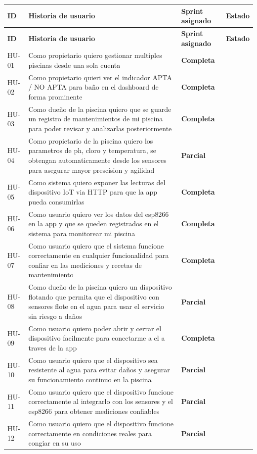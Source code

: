 \documentclass[11pt, a4paper]{article}
\begin{document}
\begin{longtable}{@{} p{1.3cm} p{7cm} p{2.5cm} p{2cm} @{}}
  \toprule
  \textbf{ID} & \textbf{Historia de usuario} & \textbf{Sprint asignado} & \textbf{Estado} \\
  \midrule
  \endfirsthead
  \toprule
  \textbf{ID} & \textbf{Historia de usuario} & \textbf{Sprint asignado} & \textbf{Estado} \\
  \midrule
  \endhead
  HU-01 & Como propietario quiero gestionar multiples piscinas desde una sola cuenta & \textcolor{success}{\textbf{Completa}} \\
  HU-02 & Como propietario quieri ver el indicador APTA / NO APTA para baño en el dashboard de forma prominente & \textcolor{success}{\textbf{Completa}} \\
  HU-03 & Como dueño de la piscina quiero que se guarde un registro de mantenimientos de mi piscina para poder revisar y analizarlas posteriormente & \textcolor{accent}{\textbf{Completa}} \\
  HU-04 & Como propietario de la piscina quiero los parametros de ph, cloro y temperatura, se obtengan automaticamente desde los sensores para asegurar mayor prescision y agilidad & \textcolor{accent}{\textbf{Parcial}} \\
  HU-05 & Como sistema quiero exponer las lecturas del dispositivo IoT via HTTP para que la app pueda consumirlas & \textcolor{accent}{\textbf{Completa}} \\
  HU-06 & Como usuario quiero ver los datos del esp8266 en la app y que se queden registrados en el sistema para monitorear mi piscina& \textcolor{accent}{\textbf{Completa}} \\
  HU-07 & Como usuario quiero que el sistema funcione correctamente en cualquier funcionalidad para confiar en las mediciones y recetas de mantenimiento & \textcolor{accent}{\textbf{Completa}} \\
  HU-08 & Como dueño de la piscina quiero un dispositivo flotando que permita que el dispositivo con sensores flote en el agua para usar el servicio sin riesgo a daños& \textcolor{accent}{\textbf{Parcial}} \\
  HU-09 & Como usuario quiero poder abrir y cerrar el dispositivo facilmente para conectarme a el a traves de la app & \textcolor{accent}{\textbf{Completa}} \\
  HU-10 & Como usuario quiero que el dispositivo sea resistente al agua para evitar daños y asegurar su funcionamiento continuo en la piscina & \textcolor{accent}{\textbf{Parcial}} \\
  HU-11 & Como usuario quiero que el dispositivo funcione correctamente al integrarlo con los sensores y el esp8266 para obtener mediciones confiables & \textcolor{accent}{\textbf{Parcial}} \\
  HU-12 & Como usuario quiero que el dispositivo funcione correctamente en condiciones reales para congiar en su uso & \textcolor{accent}{\textbf{Parcial}} \\
  \bottomrule
\end{longtable}
\end{document}
